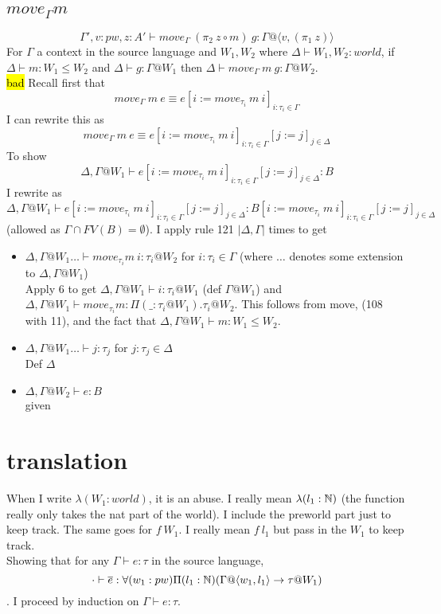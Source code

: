 \documentclass{article}
\begin{document}
\subsection*{$move_{\Gamma} m$}
 \[\Gamma', v: pw, z:A'  \vdash move_\Gamma \: (\pi_2 \: z \circ m) \: g: \Gamma @ \langle v, (\pi_1 \: z) \rangle\]
For $\Gamma$ a context in the source language and $W_1, W_2$ where $\Delta \vdash W_1, W_2 : world$, if  $\Delta \vdash m: W_1 \leq W_2$ and $\Delta \vdash g : \Gamma @ W_1$ 
then $\Delta \vdash move_{\Gamma} \:m \:g : \Gamma @ W_2$.\\
\hl{bad}
Recall first that \[move_{\Gamma} \:m \:e \equiv
e[i := move_{\tau_i} \: m\: i]_{i: \tau_i \in \Gamma}
\]
I can rewrite this as 
\[move_{\Gamma} \:m \:e \equiv
e[i := move_{\tau_i} \: m\: i]_{i: \tau_i \in \Gamma}[j := j]_{j \in \Delta}
\]
To show
\[\Delta, \Gamma @ W_1 \vdash e[i := move_{\tau_i} \: m\: i]_{i: \tau_i \in \Gamma}[j := j]_{j \in \Delta} : B\]
I rewrite as
\[\Delta, \Gamma @ W_1 \vdash e[i := move_{\tau_i} \: m\: i]_{i: \tau_i \in \Gamma}[j := j]_{j \in \Delta} : B[i := move_{\tau_i} \: m\: i]_{i: \tau_i \in \Gamma}[j := j]_{j \in \Delta}\]
(allowed as $\Gamma \cap FV(B) = \emptyset$).
I apply rule 121 $|\Delta, \Gamma|$ times to get
\begin{itemize}
    \item $\Delta, \Gamma@W_1 \dots \vdash move_{\tau_i} m\:i : \tau_i @ W_2$ for $i: \tau_i \in \Gamma$
    (where $\dots$ denotes some extension to $\Delta, \Gamma@W_1$)\\
    Apply 6 to get $\Delta, \Gamma@W_1  \vdash i: \tau_i @ W_1$ (def $\Gamma@W_1$) and $\Delta, \Gamma@W_1  \vdash move_{\tau_i} m : \Pi(\_ : \tau_i@W_1).\tau_i @ W_2$. This follows from move, (108 with 11), and the fact that  $\Delta, \Gamma@W_1 \vdash m: W_1 \leq W_2$.
    \item $\Delta, \Gamma@W_1 \dots \vdash j : \tau_j$ for $j : \tau_j \in \Delta$\\
    Def $\Delta$
    \item $\Delta, \Gamma@W_2 \vdash e: B$\\
    given
\end{itemize}

\section*{translation}
When I write $\lambda (W_1: world)$, it is an abuse. I really mean $\lambda (l_1: \mathbb{N})$ (the function really only takes the nat part of the world). I include the preworld part just to keep track. The same goes for $f \: W_1$. I really mean $f \: l_1$ but pass in the $W_1$ to keep track.\\
Showing that for any $\Gamma \vdash e : \tau$ in the source language, 
\[\cdot \vdash \overline{e}: \forall(w_1: pw)\Pi(l_1: \mathbb{N})(\Gamma @ \langle w_1, l_1 \rangle \rightarrow \tau @ W_1)\]. I proceed by induction on $\Gamma \vdash e : \tau$.\\
\end{document}
